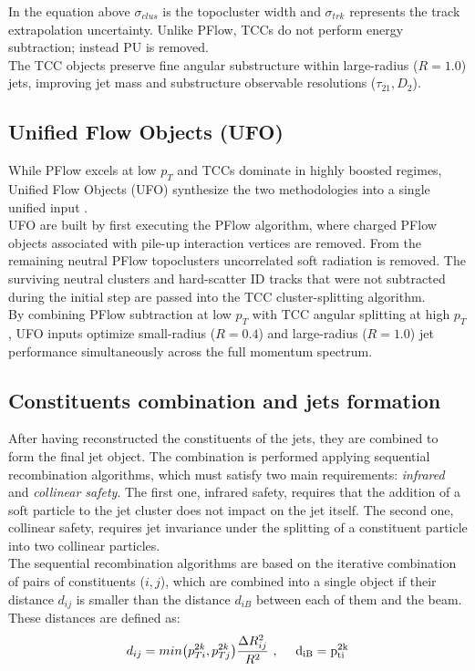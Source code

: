 \noindent In the equation above $\sigma_{clus}$ is the topocluster width and $\sigma_{trk}$ represents the track extrapolation uncertainty.
Unlike PFlow, TCCs do not perform energy subtraction; instead PU is removed.\\
The TCC objects preserve fine angular substructure within large-radius ($R = 1.0$) jets, improving jet mass and substructure observable resolutions ($\tau_{21}, D_2$).

\subsection*{Unified Flow Objects (UFO)}\label{sec:Reco/Jets/Components/UFO}

While PFlow excels at low $p_T$ and TCCs dominate in highly boosted regimes, Unified Flow Objects (UFO) synthesize the two methodologies into a single unified input \cite{ATLAS_UFO}.\\
UFO are built by first executing the PFlow algorithm, where charged PFlow objects associated with pile-up interaction vertices are removed.
From the remaining neutral PFlow topoclusters uncorrelated soft radiation is removed.
The surviving neutral clusters and hard-scatter ID tracks that were not subtracted during the initial step are passed into the TCC cluster-splitting algorithm.\\
By combining PFlow subtraction at low $p_T$ with TCC angular splitting at high $p_T$, UFO inputs optimize small-radius ($R=0.4$) and large-radius ($R=1.0$) jet performance simultaneously across the full momentum spectrum.

\subsection{Constituents combination and jets formation}\label{sec:Reco/Jets/antikt}

After having reconstructed the constituents of the jets, they are combined to form the final jet object.
The combination is performed applying sequential recombination algorithms, which must satisfy two main requirements: \textit{infrared} and \textit{collinear safety}.
The first one, infrared safety, requires that the addition of a soft particle to the jet cluster does not impact on the jet itself.
The second one, collinear safety, requires jet invariance under the splitting of a constituent particle into two collinear particles.\\
The sequential recombination algorithms are based on the iterative combination of pairs of constituents ($i, j$), which are combined into a single object if their distance $d_{ij}$ is smaller than the distance $d_{iB}$ between each of them and the beam.
These distances are defined as:
\begin{equation} \label{eq:Reco/Jets/antikt/distanceantikT}
    d_{ij}=min\big(p^{2k}_{Ti},p^{2k}_{Tj}\big)\frac{\Delta R^2_{ij}}{R^2} \ \rm \rm, \quad \ \rm \rm d_{iB}=p^{2k}_{ti} 
\end{equation}

